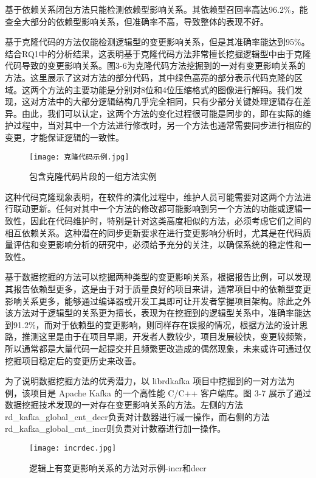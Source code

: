 基于依赖关系闭包方法只能检测依赖型影响关系。其依赖型召回率高达96.2\%，能查全大部分的依赖型影响关系，但准确率不高，导致整体的表现不好。

基于克隆代码的方法仅能检测逻辑型的变更影响关系，但是其准确率能达到95\%。结合RQ1中的分析结果，这表明基于克隆代码方法非常擅长挖掘逻辑型中由于克隆代码导致的变更影响关系。图3-6为克隆代码方法挖掘到的一对有变更影响关系的方法。这里展示了这对方法的部分代码，其中绿色高亮的部分表示代码克隆的区域。这两个方法的主要功能是分别对8位和4位压缩格式的图像进行解码。我们发现，这对方法中的大部分逻辑结构几乎完全相同，只有少部分关键处理逻辑存在差异。由此，我们可以认定，这两个方法的变化过程很可能是同步的，即在实际的维护过程中，当对其中一个方法进行修改时，另一个方法也通常需要同步进行相应的变更，才能保证逻辑的一致性。

\begin{figure}[h]
\centering
\texttt{[image: 克隆代码示例.jpg]}
\caption{包含克隆代码片段的一组方法实例}
\end{figure}

这种代码克隆现象表明，在软件的演化过程中，维护人员可能需要对这两个方法进行联动更新。任何对其中一个方法的修改都可能影响到另一个方法的功能或逻辑一致性，因此在代码维护时，特别是针对这类高度相似的方法，必须考虑它们之间的相互依赖关系。这种潜在的同步更新要求在进行变更影响分析时，尤其是在代码质量评估和变更影响分析的研究中，必须给予充分的关注，以确保系统的稳定性和一致性。

基于数据挖掘的方法可以挖掘两种类型的变更影响关系，根据报告比例，可以发现其报告依赖型更多，这是由于对于质量良好的项目来讲，通常项目中的依赖型变更影响关系更多，能够通过编译器或开发工具即可让开发者掌握项目架构。除此之外该方法对于逻辑型的关系更为擅长，表现为在挖掘到的逻辑型关系中，准确率能达到91.2\%，而对于依赖型的变更影响，则同样存在误报的情况，根据方法的设计思路，推测这里是由于在项目早期，开发者人数较少，项目发展较快，变更较频繁，所以通常都是大量代码一起提交并且频繁更改造成的偶然现象，未来或许可通过仅挖掘项目稳定后的变更历史来改善。

为了说明数据挖掘方法的优秀潜力，以 librdkafka 项目中挖掘到的一对方法为例，该项目是 Apache Kafka 的一个高性能 C/C++ 客户端库。图 3-7 展示了通过数据挖掘技术发现的一对存在变更影响关系的方法。左侧的方法rd\_kafka\_global\_cnt\_decr负责对计数器进行减一操作，而右侧的方法rd\_kafka\_global\_cnt\_incr则负责对计数器进行加一操作。

\begin{figure}[h]
\centering
\texttt{[image: incrdec.jpg]}
\caption{逻辑上有变更影响关系的方法对示例-incr和decr}
\end{figure}

